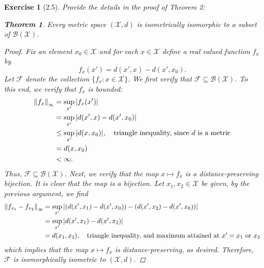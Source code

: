 \documentclass[11pt]{article}
\newtheorem{theorem}{Theorem}[section]
\newtheorem{exercise}{Exercise}
\begin{document}
\begin{exercise}[2.5]
	Provide the details in the proof of Theorem 2:
	\begin{theorem}
		Every metric space $(\mathcal{X},d)$ is isometrically isomorphic to a subset of $\mathcal{B}(\mathcal{X})$.
	\end{theorem}

	\begin{proof}
		Fix an element $x_0 \in \mathcal{X}$ and for each $x\in \mathcal{X}$ define a real valued function $f_x$ by 
		\begin{equation*}
		f_x(x') = d(x',x) - d(x',x_0).
		\end{equation*}
		Let $\mathcal{F}$ denote the collection $ \{ f_x : x\in \mathcal{X} \}$. We first verify that $\mathcal{F} \subseteq \mathcal{B}(\mathcal{X})$. To this end, we verify that $f_x$ is bounded:
		\begin{align*}
		\norm{f_x}_\infty &= \sup_{x'}\abs{f_x(x')} \\
		&= \sup_{x'}\abs{d(x',x) - d(x',x_0)} \\
		&\leq \sup_{x'}  \abs{d(x,x_0)},  \quad \mbox{triangle inequality, since $d$ is a metric} \\
		&= d(x,x_0)\\
		&< \infty.
		\end{align*}
		Thus, $\mathcal{F} \subseteq \mathcal{B}(\mathcal{X})$. Next, we verify that the map $x \mapsto f_x$ is a distance-preserving bijection. It is clear that the map is a bijection. Let $x_1, x_2 \in \mathcal{X}$ be given, by the previous argument, we find
		\begin{align*}
		\norm{f_{x_1} - f_{x_2}}_\infty 
		&= \sup_{x'} \abs{(d(x',x_1) - d(x',x_0)) - (d(x',x_2) - d(x',x_0))} \\
		&= \sup_{x'}\abs{d(x',x_1) - d(x',x_2)} \\
		&= d(x_1,x_2), \quad\mbox{triangle inequality, and maximum attained at $x'=x_1$ or $x_2$}
		\end{align*} 
		which implies that the map $x\mapsto f_x$ is distance-preserving, as desired. Therefore, $\mathcal{F}$ is isomorphically isometric to $(\mathcal{X},d)$. 
	\end{proof}
\end{exercise}
\end{document}
